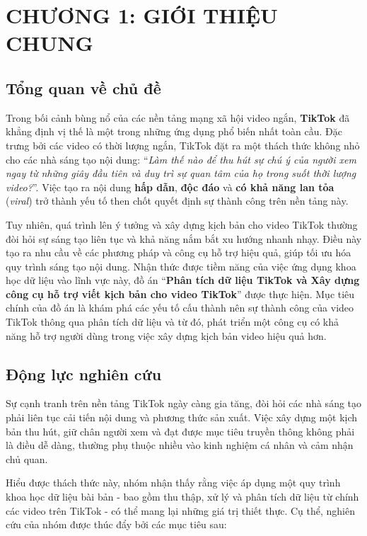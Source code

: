 \section{CHƯƠNG 1: GIỚI THIỆU CHUNG} \label{sec:intro}

\subsection{Tổng quan về chủ đề}

Trong bối cảnh bùng nổ của các nền tảng mạng xã hội video ngắn, \textbf{TikTok} đã khẳng định vị thế là một trong những ứng dụng phổ biến nhất toàn cầu. Đặc trưng bởi các video có thời lượng ngắn, TikTok đặt ra một thách thức không nhỏ cho các nhà sáng tạo nội dung: ``\textit{Làm thế nào để thu hút sự chú ý của người xem ngay từ những giây đầu tiên và duy trì sự quan tâm của họ trong suốt thời lượng video?}''. Việc tạo ra nội dung \textbf{hấp dẫn}, \textbf{độc đáo} và \textbf{có khả năng lan tỏa} (\textit{viral}) trở thành yếu tố then chốt quyết định sự thành công trên nền tảng này.

Tuy nhiên, quá trình lên ý tưởng và xây dựng kịch bản cho video TikTok thường đòi hỏi sự sáng tạo liên tục và khả năng nắm bắt xu hướng nhanh nhạy. Điều này tạo ra nhu cầu về các phương pháp và công cụ hỗ trợ hiệu quả, giúp tối ưu hóa quy trình sáng tạo nội dung. Nhận thức được tiềm năng của việc ứng dụng khoa học dữ liệu vào lĩnh vực này, đồ án ``\textbf{Phân tích dữ liệu TikTok và Xây dựng công cụ hỗ trợ viết kịch bản cho video TikTok}'' được thực hiện. Mục tiêu chính của đồ án là khám phá các yếu tố cấu thành nên sự thành công của video TikTok thông qua phân tích dữ liệu và từ đó, phát triển một công cụ có khả năng hỗ trợ người dùng trong việc xây dựng kịch bản video hiệu quả hơn.

\subsection{Động lực nghiên cứu}

Sự cạnh tranh trên nền tảng TikTok ngày càng gia tăng, đòi hỏi các nhà sáng tạo phải liên tục cải tiến nội dung và phương thức sản xuất. Việc xây dựng một kịch bản thu hút, giữ chân người xem và đạt được mục tiêu truyền thông không phải là điều dễ dàng, thường phụ thuộc nhiều vào kinh nghiệm cá nhân và cảm nhận chủ quan.

Hiểu được thách thức này, nhóm nhận thấy rằng việc áp dụng một quy trình khoa học dữ liệu bài bản - bao gồm thu thập, xử lý và phân tích dữ liệu từ chính các video trên TikTok - có thể mang lại những giá trị thiết thực. Cụ thể, nghiên cứu của nhóm được thúc đẩy bởi các mục tiêu sau:

